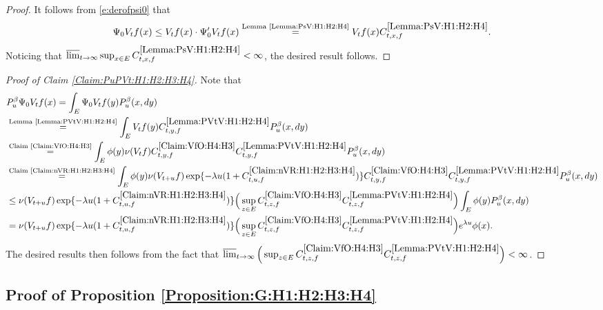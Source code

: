 \documentclass[12pt,a4paper]{amsart}
\numberwithin{equation}{section}
\theoremstyle{plain}
\theoremstyle{definition}
\theoremstyle{remark}
\newcounter{N}
\newcounter{n}[N]
\begin{document}
\begin{proof}
It follows from \eqref{e:derofpsi0} that
\begin{align}
 \Psi_0 V_t f (x)
 \leq V_tf(x)\cdot \Psi_0' V_t f(x)
 \overset{\text{Lemma \ref{Lemma:PsV:H1:H2:H4}}}= V_tf(x) C^{\ref{Lemma:PsV:H1:H2:H4}}_{t,x,f}.
 \end{align}
 Noticing that $\varlimsup_{t\to \infty} \sup_{x\in E} C^{\ref{Lemma:PsV:H1:H2:H4}}_{t,x,f} <\infty$, the desired result follows.
\end{proof}
\begin{proof}[Proof of Claim \ref{Claim:PuPVt:H1:H2:H3:H4}]
Note that
\begin{align}
 &P_u^\beta \Psi_0 V_{t} f(x)
 = \int_{E} \Psi_0V_tf(y) P_u^\beta (x,dy)
 \\&\overset{\text{Lemma \ref{Lemma:PVtV:H1:H2:H4}}}=\int_{E} V_tf(y)C^{\ref{Lemma:PVtV:H1:H2:H4}}_{t,y,f} P_u^\beta (x,dy)
  \\&\overset{\text{Claim \ref{Claim:VfO:H4:H3}}}=\int_{E} \phi(y)\nu(V_tf)C^{\ref{Claim:VfO:H4:H3}}_{t,y,f}C^{\ref{Lemma:PVtV:H1:H2:H4}}_{t,y,f} P_u^\beta (x,dy)
    \\&\overset{\text{Claim \ref{Claim:nVR:H1:H2:H3:H4}}}=\int_{E} \phi(y)\nu(V_{t+u}f) \exp\{-\lambda u (1+C^{\ref{Claim:nVR:H1:H2:H3:H4}}_{t,u,f}) \} C^{\ref{Claim:VfO:H4:H3}}_{t,y,f}C^{\ref{Lemma:PVtV:H1:H2:H4}}_{t,y,f} P_u^\beta (x,dy)
    \\& \leq \nu(V_{t+u}f) \exp\{-\lambda u (1+C^{\ref{Claim:nVR:H1:H2:H3:H4}}_{t,u,f}) \} \Big(\sup_{z\in E} C^{\ref{Claim:VfO:H4:H3}}_{t,z,f}C^{\ref{Lemma:PVtV:H1:H2:H4}}_{t,z,f}\Big) \int_{E} \phi(y) P_u^\beta (x,dy)
    \\& = \nu(V_{t+u}f) \exp\{-\lambda u (1+C^{\ref{Claim:nVR:H1:H2:H3:H4}}_{t,u,f}) \} \Big(\sup_{z\in E} C^{\ref{Claim:VfO:H4:H3}}_{t,z,f}C^{\ref{Lemma:PVtV:H1:H2:H4}}_{t,z,f}\Big) e^{\lambda u}\phi(x).
 \end{align}
 The desired results then follows from the fact that $\varlimsup_{t\to \infty} \Big(\sup_{z\in E} C^{\ref{Claim:VfO:H4:H3}}_{t,z,f}C^{\ref{Lemma:PVtV:H1:H2:H4}}_{t,z,f}\Big) < \infty$.
\end{proof}
\subsection{Proof of Proposition \ref{Proposition:G:H1:H2:H3:H4}}\label{sec:G}
\end{document}
